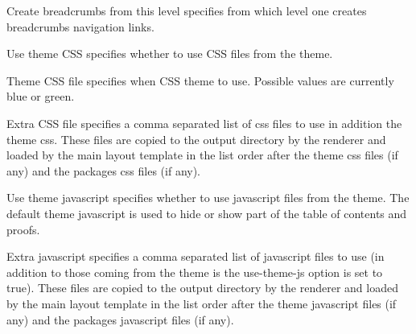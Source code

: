 \begin{configuration}{Create breadcrumbs from this level}
specifies from which level one creates breadcrumbs navigation links.
\end{configuration}

\begin{configuration}{Use theme CSS}
specifies whether to use CSS files from the theme.
\end{configuration}

\begin{configuration}{Theme CSS file}
specifies when CSS theme to use. Possible values are currently blue or
green.
\end{configuration}

\begin{configuration}{Extra CSS file}
specifies a comma separated list of css files to use in addition the
theme css. These files are copied to the output directory by the
renderer and loaded by the main layout template in the list order after
the theme css files (if any) and the packages css files (if any).
\end{configuration}

\begin{configuration}{Use theme javascript}
specifies whether to use javascript files from the theme. The default
theme javascript is used to hide or show part of the table of contents
and proofs.
\end{configuration}

\begin{configuration}{Extra javascript}
specifies a comma separated list of javascript files to use (in addition
to those coming from the theme is the use-theme-js option is set to true).
These files are copied to the output directory by the
renderer and loaded by the main layout template in the list order after
the theme javascript files (if any) and the packages javascript files (if any).
\end{configuration}


